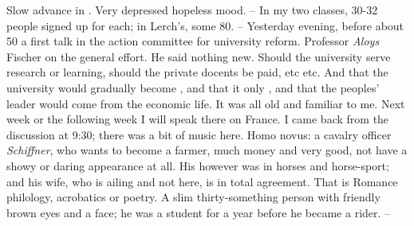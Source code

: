 
Slow advance in . Very depressed hopeless mood. -- In my two classes, 30-32 people signed up for each; in Lerch's, some 80. -- Yesterday evening, before about 50  a first talk in the action committee for university reform. Professor \textit{Aloys} Fischer on the general effort. He said nothing new. Should the university serve research or learning, should the private docents be paid, etc etc. And that the university would gradually become , and that it only , and that the peoples' leader would come from the economic life. It was all old and familiar to me. Next week or the following week I will speak there on France. I came back from the discussion at 9:30; there was a bit of music here. Homo novus: a  cavalry officer \textit{Schiffner}, who wants to become a farmer, much money and very good, not have a showy or daring appearance at all. His  however was in horses and horse-sport; and his wife, who is ailing and not here, is in total agreement. That is  Romance philology, acrobatics or poetry. A slim thirty-something person with friendly brown eyes and a  face; he was a student for a year before he became a rider. --

\missing


%